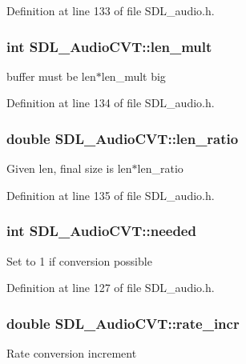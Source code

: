 Definition at line 133 of file S\+D\+L\+\_\+audio.\+h.

\hypertarget{structSDL__AudioCVT_ac9662d47cf2348b82b27b151150116b0}{
\subsubsection[{len\+\_\+mult}]{\setlength{\rightskip}{0pt plus 5cm}int S\+D\+L\+\_\+\+Audio\+C\+V\+T\+::len\+\_\+mult}}\label{structSDL__AudioCVT_ac9662d47cf2348b82b27b151150116b0}
buffer must be len$\ast$len\+\_\+mult big 

Definition at line 134 of file S\+D\+L\+\_\+audio.\+h.

\hypertarget{structSDL__AudioCVT_a5628ff5ccf711de9d77c0a4a9f57d2f0}{
\subsubsection[{len\+\_\+ratio}]{\setlength{\rightskip}{0pt plus 5cm}double S\+D\+L\+\_\+\+Audio\+C\+V\+T\+::len\+\_\+ratio}}\label{structSDL__AudioCVT_a5628ff5ccf711de9d77c0a4a9f57d2f0}
Given len, final size is len$\ast$len\+\_\+ratio 

Definition at line 135 of file S\+D\+L\+\_\+audio.\+h.

\hypertarget{structSDL__AudioCVT_ac600a035a48df05e14d3712fd6953ad4}{
\subsubsection[{needed}]{\setlength{\rightskip}{0pt plus 5cm}int S\+D\+L\+\_\+\+Audio\+C\+V\+T\+::needed}}\label{structSDL__AudioCVT_ac600a035a48df05e14d3712fd6953ad4}
Set to 1 if conversion possible 

Definition at line 127 of file S\+D\+L\+\_\+audio.\+h.

\hypertarget{structSDL__AudioCVT_ad886122c23a6673073baace31bff3b6c}{
\subsubsection[{rate\+\_\+incr}]{\setlength{\rightskip}{0pt plus 5cm}double S\+D\+L\+\_\+\+Audio\+C\+V\+T\+::rate\+\_\+incr}}\label{structSDL__AudioCVT_ad886122c23a6673073baace31bff3b6c}
Rate conversion increment 

